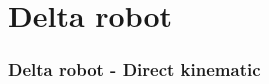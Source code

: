 %
\section[Delta robot]{Delta robot}
%
\begin{frame}
	\frametitle{Delta robot - Direct kinematic}
\end{frame}
